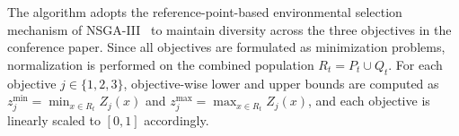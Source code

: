\documentclass[a4paper,fleqn]{cas-sc}
\newcommand\todoi[1]{\todo[inline]{#1}}
\begin{document}


The algorithm adopts the reference-point-based environmental selection mechanism
of NSGA-III~\citep{deb2014nsga3} to maintain diversity across the three objectives in the conference paper.
Since all objectives are formulated as minimization problems, normalization is
performed on the combined population $R_t = P_t \cup Q_t$.
For each objective $j \in \{1,2,3\}$, objective-wise lower and upper bounds are
computed as
$z_j^{\min} = \min_{x \in R_t} Z_j(x)$ and
$z_j^{\max} = \max_{x \in R_t} Z_j(x)$,
and each objective is linearly scaled to $[0,1]$ accordingly.
\end{document}
